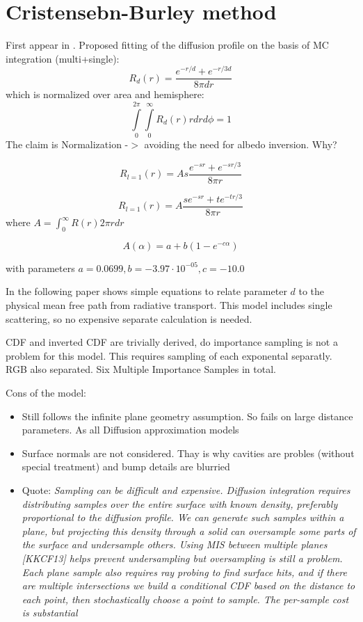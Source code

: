 \section{Cristensebn-Burley method}

First appear in \cite{Burley:disney_siggraph15}. Proposed fitting of the
diffusion profile on the basis of MC integration (multi+single):
\[
R_d(r) = \dfrac{e^{-r/d}+e^{-r/3d}}{8\pi dr}
\]
which is normalized over area and hemisphere:
\[
\int\limits_0^{2\pi}\int\limits_0^\infty R_d(r)rdrd\phi = 1
\]
The claim is Normalization -$>$ avoiding the need for albedo inversion. Why?

\[
R_{l=1}(r) = As\dfrac{e^{-sr}+e^{-sr/3}}{8\pi r}
\]

\[
R_{l=1}(r) = A\dfrac{se^{-sr}+te^{-tr/3}}{8\pi r}
\]
where $A=\int_0^{\infty} R(r)2\pi rdr$

\[
A(\alpha) = a + b(1- e^{-c\alpha})
\]

with parameters $a = 0.0699, b = -3.97\cdot 10^{-05}, c =
-10.0$

In the following paper \cite{Christensen:2015:ARP:2775280.2792555} shows simple
equations to relate parameter $d$ to the physical mean free path from radiative
transport. This model includes single scattering, so no expensive separate
calculation is needed.

CDF and inverted CDF are trivially derived, do importance sampling is not a
problem for this model. This requires sampling of each exponental separatly. RGB
also separated. Six Multiple Importance Samples in total.

Cons of the model:
\begin{itemize}
  \item {Still follows the infinite plane geometry assumption. So fails on
  large distance parameters. As all Diffusion approximation models}
  \item {Surface normals are not considered. Thay is why cavities are probles
  (without special treatment) and bump details are blurried}
  \item{Quote: \textit{Sampling can be difficult and expensive. Diffusion
  integration requires distributing samples over the entire surface with known
  density, preferably proportional to the diffusion profile. We can generate
  such samples within a plane, but projecting this density through a solid can
  oversample some parts of the surface and undersample others. Using MIS between
  multiple planes [KKCF13] helps prevent undersampling but oversampling is still
  a problem. Each plane sample also requires ray probing to find surface hits,
  and if there are multiple intersections we build a conditional CDF based on
  the distance to each point, then stochastically choose a point to sample. The
  per-sample cost is substantial}}
\end{itemize}